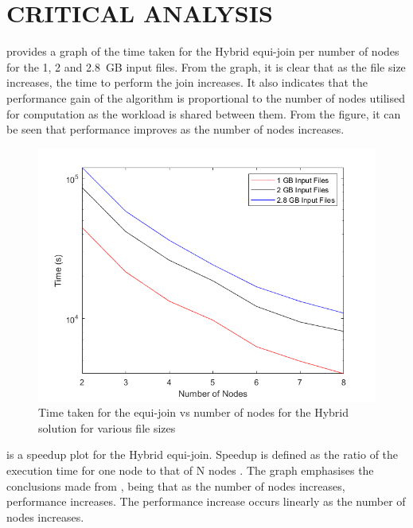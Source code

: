 \documentclass[12pt,twocolumn]{witseiepaper}
\begin{document}
\section{CRITICAL ANALYSIS}

 provides a graph of the time taken for the Hybrid equi-join per number of nodes for the 1, 2 and 2.8~GB input files. From the graph, it is clear that as the file size increases, the time to perform the join increases. It also indicates that the performance gain of the algorithm is proportional to the number of nodes utilised for computation as the workload is shared between them. From the figure, it can be seen that performance improves as the number of nodes increases.

\begin{figure}[h]
	\centering
	\includegraphics[width=1\columnwidth]{hybrid-time.png}
	\caption{Time taken for the equi-join vs number of nodes for the Hybrid solution for various file sizes}
	\raggedright
	\label{fig:resultsH}	
\end{figure}

 is a speedup plot for the Hybrid equi-join. Speedup is defined as the ratio of the execution time for one node to that of N nodes \cite{speedup}. The graph emphasises the conclusions made from , being that as the number of nodes increases, performance increases. The performance increase occurs linearly as the number of nodes increases.
\end{document}
